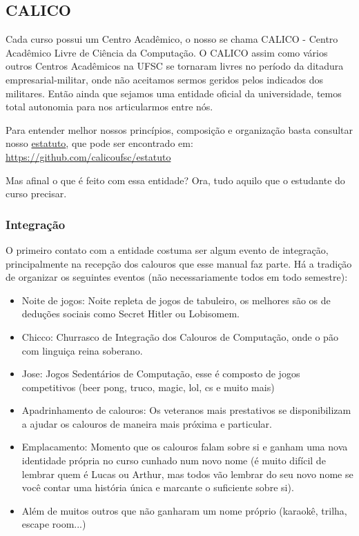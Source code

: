 \subsection{CALICO}
Cada curso possui um Centro Acadêmico, o nosso se chama CALICO - Centro Acadêmico Livre de Ciência da Computação. O CALICO assim como vários outros Centros Acadêmicos na UFSC se tornaram livres no período da ditadura empresarial-militar, onde não aceitamos sermos geridos pelos indicados dos militares. Então ainda que sejamos uma entidade oficial da universidade, temos total autonomia para nos articularmos entre nós.

Para entender melhor nossos princípios, composição e organização basta consultar nosso \href{https://github.com/calicoufsc/estatuto}{estatuto}, que pode ser encontrado em: \href{https://github.com/calicoufsc/estatuto}{https://github.com/calicoufsc/estatuto}

Mas afinal o que é feito com essa entidade? Ora, tudo aquilo que o estudante do curso precisar.

\subsubsection{Integração}

O primeiro contato com a entidade costuma ser algum evento de integração, principalmente na recepção dos calouros que esse manual faz parte. Há a tradição de organizar os seguintes eventos (não necessariamente todos em todo semestre):
\begin{itemize}
    \item Noite de jogos: Noite repleta de jogos de tabuleiro, os melhores são os de deduções sociais como Secret Hitler ou Lobisomem.
    \item Chicco: Churrasco de Integração dos Calouros de Computação, onde o pão com linguiça reina soberano.
    \item Jose: Jogos Sedentários de Computação, esse é composto de jogos competitivos (beer pong, truco, magic, lol, cs e muito mais)
    \item Apadrinhamento de calouros: Os veteranos mais prestativos se disponibilizam a ajudar os calouros de maneira mais próxima e particular.
    \item Emplacamento: Momento que os calouros falam sobre si e ganham uma nova identidade própria no curso cunhado num novo nome (é muito difícil de lembrar quem é Lucas ou Arthur, mas todos vão lembrar do seu novo nome se você contar uma história única e marcante o suficiente sobre si). 
    \item Além de muitos outros que não ganharam um nome próprio (karaokê, trilha, escape room...)
\end{itemize}


